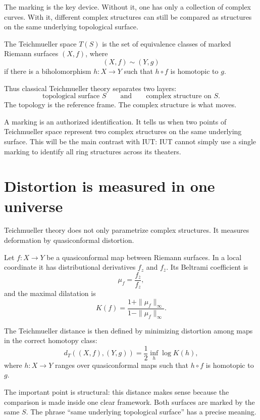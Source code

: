 The marking is the key device.  Without it, one has only a collection of complex curves.  With it, different complex structures can still be compared as structures on the same underlying topological surface.

\begin{definition}
The Teichmueller space \(T(S)\) is the set of equivalence classes of marked Riemann surfaces \((X,f)\), where
\[
  (X,f)\sim(Y,g)
\]
if there is a biholomorphism \(h:X\to Y\) such that \(h\circ f\) is homotopic to \(g\).
\end{definition}

Thus classical Teichmueller theory separates two layers:
\[
  \text{topological surface } S
  \qquad\text{and}\qquad
  \text{complex structure on } S.
\]
The topology is the reference frame.  The complex structure is what moves.

\begin{remark}
A marking is an authorized identification.  It tells us when two points of Teichmueller space represent two complex structures on the same underlying surface.  This will be the main contrast with IUT: IUT cannot simply use a single marking to identify all ring structures across its theaters.
\end{remark}

\section{Distortion is measured in one universe}

Teichmueller theory does not only parametrize complex structures.  It measures deformation by quasiconformal distortion.

\begin{definition}
Let \(f:X\to Y\) be a quasiconformal map between Riemann surfaces.  In a local coordinate it has distributional derivatives \(f_z\) and \(f_{\bar z}\).  Its Beltrami coefficient is
\[
  \mu_f=\frac{f_{\bar z}}{f_z},
\]
and the maximal dilatation is
\[
  K(f)=\frac{1+\|\mu_f\|_{\infty}}{1-\|\mu_f\|_{\infty}}.
\]
\end{definition}

The Teichmueller distance is then defined by minimizing distortion among maps in the correct homotopy class:
\[
  d_T((X,f),(Y,g))
  =\frac12\inf_h \log K(h),
\]
where \(h:X\to Y\) ranges over quasiconformal maps such that \(h\circ f\) is homotopic to \(g\).

The important point is structural: this distance makes sense because the comparison is made inside one clear framework.  Both surfaces are marked by the same \(S\).  The phrase ``same underlying topological surface'' has a precise meaning.

